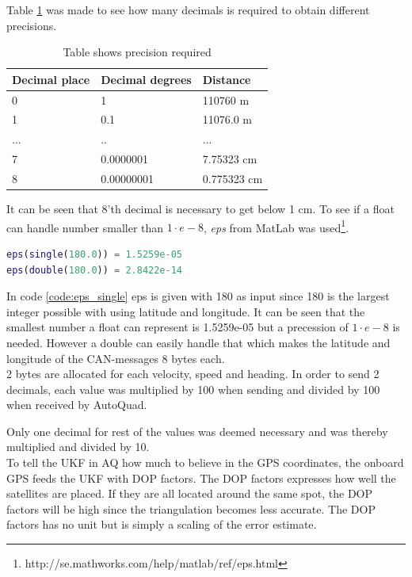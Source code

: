 Table \ref{tab:precision_latlon} was made to see how many decimals is required to obtain different precisions.
\begin{table}[H]
\centering
\caption{Table shows precision required}
\label{tab:precision_latlon}
\begin{tabular}{@{}|l|l|l|@{}}
\toprule
Decimal place & Decimal degrees & Distance    \\ \midrule
0             & 1               & 110760 m    \\ \midrule
1             & 0.1             & 11076.0 m   \\ \midrule
...           & ..              & ...         \\ \midrule
7             & 0.0000001       & 7.75323 cm  \\ \midrule
8             & 0.00000001      & 0.775323 cm \\ \bottomrule
\end{tabular}
\end{table}

It can be seen that 8'th decimal is necessary to get below 1 cm. 
To see if a float can handle number smaller than $1\cdot e-8$, \textit{eps} from MatLab was used\footnote{http://se.mathworks.com/help/matlab/ref/eps.html}.
\begin{lstlisting}[language = matlab, caption = Check if float is precise enough of a double has to be used, label=code:eps_single]
eps(single(180.0)) = 1.5259e-05
eps(double(180.0)) = 2.8422e-14
\end{lstlisting}
In code \ref{code:eps_single} eps is given with 180 as input since 180 is the largest integer possible with using latitude and longitude.
It can be seen that the smallest number a float can represent is 1.5259e-05 but a precession of $1\cdot e-8$ is needed.
However a double can easily handle that which makes the latitude and longitude of the CAN-messages 8 bytes each. \\

2 bytes are allocated for each velocity, speed and heading. In order to send 2 decimals, each value was multiplied by 100 when sending and divided by 100 when received by AutoQuad.

Only one decimal for rest of the values was deemed necessary and was thereby multiplied and divided by 10. \\

To tell the UKF in AQ how much to believe in the GPS coordinates, the onboard GPS feeds the UKF with DOP factors. The DOP factors expresses how well the satellites are placed. If they are all located around the same spot, the DOP factors will be high since the triangulation becomes less accurate. The DOP factors has no unit but is simply a scaling of the error estimate. \cite{kelddueholmmikkellaurentziusannab.o.jensen2015}

